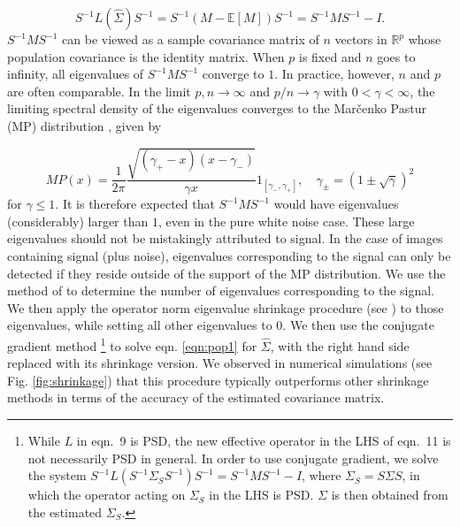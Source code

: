 \begin{equation}
 S^{-1} L(\hat\Sigma)  S^{-1} = S^{-1}(M - \mathbb{E}[M]) S^{-1} = S^{-1} M S^{-1} - I .
\label{eqn:pop1}
\end{equation}
$S^{-1}MS^{-1}$ can be viewed as a sample covariance matrix of
$n$ vectors in $ \mathbb{R}^p$ whose population covariance is the identity matrix.
When $p$ is fixed and $n$ goes to infinity, all eigenvalues of $S^{-1}MS^{-1}$ converge to $1$.
In practice, however, $n$ and $p$ are often comparable. In the limit $p, n \to 
\infty$ and $p/n \to \gamma$ with $0 < \gamma < \infty$, the limiting spectral 
density of the eigenvalues converges to the Mar\v{c}enko Pastur (MP) distribution \cite{marcenko},
given by

\begin{equation}
MP(x) = \frac{1}{2\pi}\frac{\sqrt{(\gamma_+ - x)(x - \gamma_-)}}{\gamma x}1_{[\gamma_-,\gamma_+]}, \quad \gamma_{\pm} =(1 \pm \sqrt{\gamma})^2 
\end{equation}
for $\gamma \leq 1$. It is therefore expected that $S^{-1}MS^{-1}$ would have eigenvalues 
(considerably) larger than $1$, even in the pure white noise case. These large 
eigenvalues should not be mistakingly attributed to signal. In the case of 
images containing signal (plus noise), eigenvalues corresponding to the signal 
can only be detected if they reside outside of the support of the MP 
distribution. We use the method of \cite{knadler} to determine the number of eigenvalues 
corresponding to the signal. We then apply the operator norm eigenvalue 
shrinkage procedure (see \cite{donoho}) to those eigenvalues, while setting all other eigenvalues to 
$0$. We then use the conjugate gradient method \footnote{While $L$ in eqn.\ 9 is PSD, the new effective operator in the LHS of eqn.\ 11 is not necessarily PSD in general.
In order to use conjugate gradient, we solve the system $S^{-1}L(S^{-1}\Sigma_S S^{-1})S^{-1} = S^{-1}MS^{-1}-I$, where
$\Sigma_S = S \Sigma S$, in which the operator acting on $\Sigma_S$ in the LHS is PSD. $\Sigma$ is then obtained
from the estimated $\Sigma_S$.
} to solve eqn. \ref{eqn:pop1} for $\hat{\Sigma}$, with the right hand side 
replaced with its shrinkage version. We observed in numerical simulations (see Fig. \ref{fig:shrinkage}) that this procedure
typically outperforms other shrinkage methods in terms of the accuracy of the estimated covariance matrix.
 

